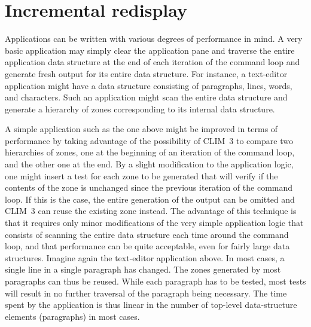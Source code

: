 \documentclass{report}
\def\clim{CLIM~3}
\begin{document}
\section{Incremental redisplay}

Applications can be written with various degrees of performance in
mind.  A very basic application may simply clear the application pane
and traverse the entire application data structure at the end of each
iteration of the command loop and generate fresh output for its entire
data structure.  For instance, a text-editor application might have a
data structure consisting of paragraphs, lines, words, and characters.
Such an application might scan the entire data structure and generate
a hierarchy of zones corresponding to its internal data structure. 

A simple application such as the one above might be improved in terms
of performance by taking advantage of the possibility of \clim{} to
compare two hierarchies of zones, one at the beginning of an
iteration of the command loop, and the other one at the end.  By
a slight modification to the application logic, one might insert a
test for each zone to be generated that will verify if the contents
of the zone is unchanged since the previous iteration of the command
loop.  If this is the case, the entire generation of the output can be
omitted and \clim{} can reuse the existing zone instead.  The
advantage of this technique is that it requires only minor
modifications of the very simple application logic that consists of
scanning the entire data structure each time around the command loop,
and that performance can be quite acceptable, even for fairly large
data structures.  Imagine again the text-editor application above.  In
most cases, a single line in a single paragraph has changed.  The
zones generated by most paragraphs can thus be reused.  While each
paragraph has to be tested, most tests will result in no further
traversal of the paragraph being necessary.  The time spent by the
application is thus linear in the number of top-level data-structure
elements (paragraphs) in most cases.  
\end{document}
